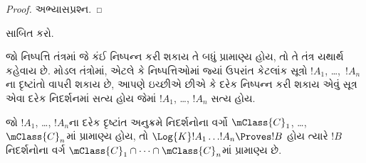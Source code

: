 \begin{proof}
  અભ્યાસપ્રશ્ન.
\end{proof}

\begin{prob}
   સાબિત કરો.
\end{prob}
\endgroup

\begingroup
\makeatletter{}\makeatother


\label{guunit:OLP-0436}


જો નિષ્પત્તિ તંત્રમાં જે કંઈ નિષ્પન્ન કરી શકાય તે બધું
પ્રામાણ્ય હોય, તો તે તંત્ર યથાર્થ કહેવાય છે. મોડલ તંત્રોમાં, એટલે કે
નિષ્પત્તિઓમાં જ્યાં  ઉપરાંત કેટલાંક સૂત્રો $!A_1$,
\dots,~$!A_n$ના દૃષ્ટાંતો વાપરી શકાય છે, આપણે ઇચ્છીએ છીએ કે દરેક
નિષ્પન્ન કરી શકાય એવું સૂત્ર એવા દરેક નિદર્શનમાં સત્ય હોય જેમાં $!A_1$,
\dots, $!A_n$ સત્ય હોય.

\begin{thm}[યથાર્થતાનું પ્રમેય]
  જો $!A_1$, \dots, $!A_n$ના દરેક દૃષ્ટાંત અનુક્રમે નિદર્શનોના
  વર્ગો $\mClass{C}_1$, \dots, $\mClass{C}_n$માં પ્રામાણ્ય હોય,
  તો $\Log{K}!A_1\dots !A_n
  \Proves !B$ હોય ત્યારે $!B$ નિદર્શનોના વર્ગ
  $\mClass{C}_1 \cap \dots \cap \mClass{C}_n$માં પ્રામાણ્ય છે.
\end{thm}

